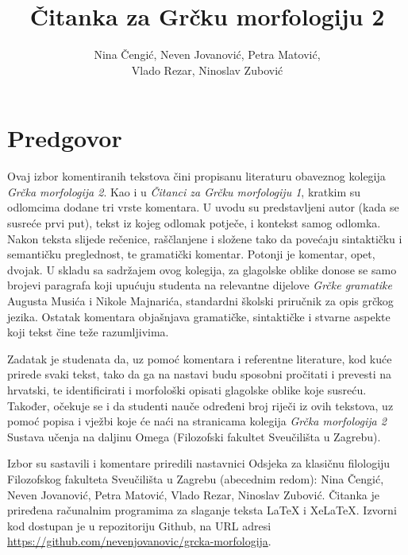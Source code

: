 \documentclass[a4paper,12pt,twoside]{report}
\newcommand{\subtitle}[1]{%
  \posttitle{%
    \par\end{center}
    \begin{center}\large#1\end{center}
    \vskip0.5em}%
}
\begin{document}
\title{Čitanka za Grčku morfologiju 2}
\author{Nina Čengić, Neven Jovanović, Petra Matović,\\Vlado Rezar, Ninoslav Zubović}
\date{}
\maketitle

\clearpage

\tableofcontents

\thispagestyle{empty}




\chapter*{Predgovor}
\label{chap:predgovor}

Ovaj izbor komentiranih tekstova čini propisanu literaturu obaveznog kolegija \textit{Grčka morfologija 2}. Kao i u \textit{Čitanci za Grčku morfologiju 1}, kratkim su odlomcima dodane tri vrste komentara. U uvodu su predstavljeni autor (kada se susreće prvi put), tekst iz kojeg odlomak potječe, i kontekst samog odlomka. Nakon teksta slijede rečenice, raščlanjene i složene tako da povećaju sintaktičku i semantičku preglednost, te gramatički komentar. Potonji je komentar, opet, dvojak. U skladu sa sadržajem ovog kolegija, za glagolske oblike donose se samo brojevi paragrafa koji upućuju studenta na relevantne dijelove \textit{Grčke gramatike} Augusta Musića i Nikole Majnarića, standardni školski priručnik za opis grčkog jezika. Ostatak komentara objašnjava gramatičke, sintaktičke i stvarne aspekte koji tekst čine teže razumljivima.

Zadatak je studenata da, uz pomoć komentara i referentne literature, kod kuće prirede svaki tekst, tako da ga na nastavi budu sposobni pročitati i prevesti na hrvatski, te identificirati i morfološki opisati glagolske oblike koje susreću. Također, očekuje se i da studenti nauče određeni broj riječi iz ovih tekstova, uz pomoć popisa i vježbi koje će naći na stranicama kolegija \textit{Grčka morfologija 2} Sustava učenja na daljinu Omega (Filozofski fakultet Sveučilišta u Zagrebu).


Izbor su sastavili i komentare priredili nastavnici Odsjeka za klasičnu filologiju Filozofskog fakulteta Sveučilišta u Zagrebu (abecednim redom): Nina Čengić, Neven Jovanović, Petra Matović, Vlado Rezar, Ninoslav Zubović. Čitanka je priređena računalnim programima za slaganje teksta LaTeX i XeLaTeX. Izvorni kod dostupan je u repozitoriju Github, na URL adresi \url{https://github.com/nevenjovanovic/grcka-morfologija}.
\end{document}
